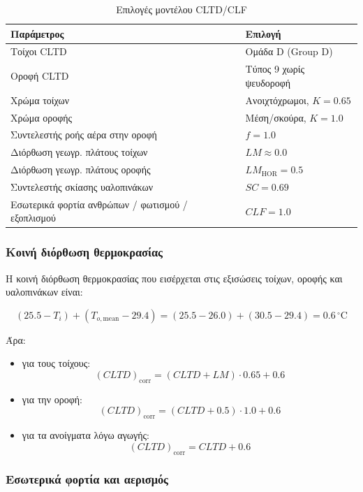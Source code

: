 \documentclass[12pt,a4paper]{article}
\begin{document}
\begin{table}[H]
\centering
\caption{Επιλογές μοντέλου CLTD/CLF}
\begin{tabularx}{\textwidth}{L C{4.0cm}}
\toprule
\textbf{Παράμετρος} & \textbf{Επιλογή} \\
\midrule
Τοίχοι CLTD & Ομάδα D (\textenglish{Group D}) \\
Οροφή CLTD & Τύπος 9 χωρίς ψευδοροφή \\
Χρώμα τοίχων & Ανοιχτόχρωμοι, \(K=0.65\) \\
Χρώμα οροφής & Μέση/σκούρα, \(K=1.0\) \\
Συντελεστής ροής αέρα στην οροφή & \(f = 1.0\) \\
Διόρθωση γεωγρ. πλάτους τοίχων & \(LM \approx 0.0\) \\
Διόρθωση γεωγρ. πλάτους οροφής & \(LM_{\mathrm{HOR}} = 0.5\) \\
Συντελεστής σκίασης υαλοπινάκων & \(SC = 0.69\) \\
Εσωτερικά φορτία ανθρώπων / φωτισμού / εξοπλισμού & \(CLF = 1.0\) \\
\bottomrule
\end{tabularx}
\end{table}

\subsubsection{Κοινή διόρθωση θερμοκρασίας}

Η κοινή διόρθωση θερμοκρασίας που εισέρχεται στις εξισώσεις τοίχων, οροφής και
υαλοπινάκων είναι:

\[
(25.5 - T_i) + (T_{o,\mathrm{mean}} - 29.4)
=
(25.5 - 26.0) + (30.5 - 29.4)
=
0.6\,^\circ\mathrm{C}
\]

Άρα:

\begin{itemize}
\item για τους τοίχους:
\[
(CLTD)_{\text{corr}} = (CLTD + LM)\cdot 0.65 + 0.6
\]
\item για την οροφή:
\[
(CLTD)_{\text{corr}} = (CLTD + 0.5)\cdot 1.0 + 0.6
\]
\item για τα ανοίγματα λόγω αγωγής:
\[
(CLTD)_{\text{corr}} = CLTD + 0.6
\]
\end{itemize}

\subsubsection{Εσωτερικά φορτία και αερισμός}
\end{document}
